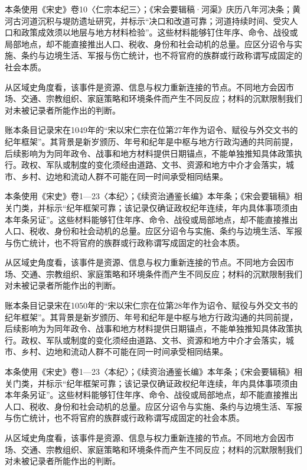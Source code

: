 本条使用《宋史》卷10〈仁宗本纪三〉；《宋会要辑稿·河渠》庆历八年河决条；黄河古河道沉积与堤防遗址研究，并标示“决口和改道可靠；河道持续时间、受灾人口和政策成效须以地层与地方材料检验”。这些材料能够钉住年序、命令、战役或局部地点，却不能直接推出人口、税收、身份和社会动机的总量。应区分诏令与实施、条约与边境生活、军报与伤亡统计，也不将官府的族群或行政称谓写成固定的社会本质。

从区域史角度看，该事件是资源、信息与权力重新连接的节点。不同地方会因市场、交通、宗教组织、家庭策略和环境条件而产生不同反应；材料的沉默限制我们对未被记录者所能作出的判断。

账本条目记录宋在1049年的“宋以宋仁宗在位第27年作为诏令、赋役与外交文书的纪年框架”。其背景是新岁颁历、年号和纪年是中枢与地方行政沟通的共同前提，后续影响为为同年政令、战事和地方材料提供日期锚点，不能单独推知具体政策执行。政权、军队或制度的变化须经由道路、文书、资源和地方中介才会落实，城市、乡村、边地和流动人群不可能在同一时间承受相同结果。

本条使用《宋史》卷1—23〈本纪〉；《续资治通鉴长编》本年条；《宋会要辑稿》相关门类，并标示“纪年框架可靠；该记录仅确证政权纪年连续，年内具体事项须由本年条另证”。这些材料能够钉住年序、命令、战役或局部地点，却不能直接推出人口、税收、身份和社会动机的总量。应区分诏令与实施、条约与边境生活、军报与伤亡统计，也不将官府的族群或行政称谓写成固定的社会本质。

从区域史角度看，该事件是资源、信息与权力重新连接的节点。不同地方会因市场、交通、宗教组织、家庭策略和环境条件而产生不同反应；材料的沉默限制我们对未被记录者所能作出的判断。

账本条目记录宋在1050年的“宋以宋仁宗在位第28年作为诏令、赋役与外交文书的纪年框架”。其背景是新岁颁历、年号和纪年是中枢与地方行政沟通的共同前提，后续影响为为同年政令、战事和地方材料提供日期锚点，不能单独推知具体政策执行。政权、军队或制度的变化须经由道路、文书、资源和地方中介才会落实，城市、乡村、边地和流动人群不可能在同一时间承受相同结果。

本条使用《宋史》卷1—23〈本纪〉；《续资治通鉴长编》本年条；《宋会要辑稿》相关门类，并标示“纪年框架可靠；该记录仅确证政权纪年连续，年内具体事项须由本年条另证”。这些材料能够钉住年序、命令、战役或局部地点，却不能直接推出人口、税收、身份和社会动机的总量。应区分诏令与实施、条约与边境生活、军报与伤亡统计，也不将官府的族群或行政称谓写成固定的社会本质。

从区域史角度看，该事件是资源、信息与权力重新连接的节点。不同地方会因市场、交通、宗教组织、家庭策略和环境条件而产生不同反应；材料的沉默限制我们对未被记录者所能作出的判断。

